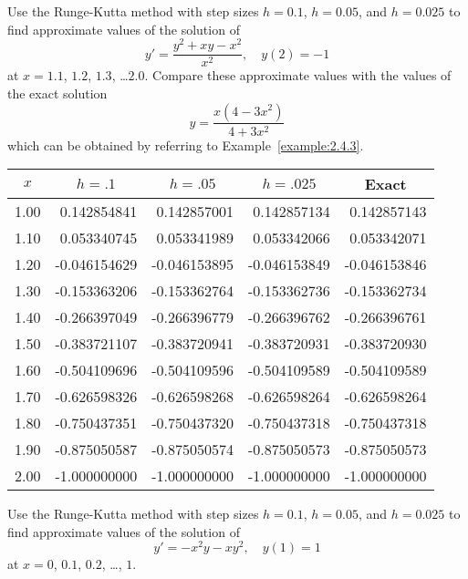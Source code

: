 \documentclass{ximera}
\begin{document}
\begin{problem}\label{exer:3.3.24}
Use the Runge-Kutta  method with step sizes $h=0.1$, $h=0.05$,
and $h=0.025$ to find approximate values of the solution of
$$
y'=\frac{y^2+xy-x^2}{x^2},\quad y(2)=-1
$$
at $x=1.1$, $1.2$, $1.3$, \dots $2.0$.
 Compare these approximate values
with the values of the exact solution
$$
y=\frac{x(4-3x^2)}{4+3x^2}
$$
which can be obtained by referring to Example~\ref{example:2.4.3}.

\begin{solution}
    {\small
\begin{tabular}{|r|r|r|r|r|}
\hline
\multicolumn{1}{|c|}{$x$}&
\multicolumn{1}{|c|}{$h=.1$}&
\multicolumn{1}{|c|}{$h=.05$}&
\multicolumn{1}{|c|}{$h=.025$}&
\multicolumn{1}{|c|}{Exact}\\ \hline
1.00  &  0.142854841 &  0.142857001 &  0.142857134 &  0.142857143 \\
1.10  &  0.053340745 &  0.053341989 &  0.053342066 &  0.053342071 \\
1.20  & -0.046154629 & -0.046153895 & -0.046153849 & -0.046153846 \\
1.30  & -0.153363206 & -0.153362764 & -0.153362736 & -0.153362734 \\
1.40  & -0.266397049 & -0.266396779 & -0.266396762 & -0.266396761 \\
1.50  & -0.383721107 & -0.383720941 & -0.383720931 & -0.383720930 \\
1.60  & -0.504109696 & -0.504109596 & -0.504109589 & -0.504109589 \\
1.70  & -0.626598326 & -0.626598268 & -0.626598264 & -0.626598264 \\
1.80  & -0.750437351 & -0.750437320 & -0.750437318 & -0.750437318 \\
1.90  & -0.875050587 & -0.875050574 & -0.875050573 & -0.875050573 \\
2.00  & -1.000000000 & -1.000000000 & -1.000000000 & -1.000000000 \\
\hline
\end{tabular}}
\end{solution}
\end{problem}

\begin{problem}\label{exer:3.3.25}
Use the Runge-Kutta  method with step sizes $h=0.1$,  $h=0.05$,
and $h=0.025$
 to find approximate values of the solution of
$$
y'=-x^2y-xy^2,\quad y(1)=1
$$
at $x=0$, $0.1$, $0.2$, \dots, $1$.
\end{problem}
\end{document}
